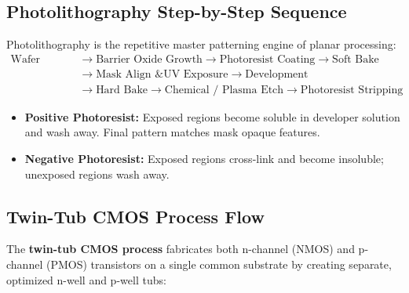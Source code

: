 \documentclass[12pt,a4paper]{article}
\begin{document}
\subsection{Photolithography Step-by-Step Sequence}
Photolithography is the repetitive master patterning engine of planar processing:
\begin{align*}
  \text{Wafer Clean} &\to \text{Barrier Oxide Growth} \to \text{Photoresist Coating} \to \text{Soft Bake} \\
  &\to \text{Mask Align \& UV Exposure} \to \text{Development} \\
  &\to \text{Hard Bake} \to \text{Chemical / Plasma Etch} \to \text{Photoresist Stripping}
\end{align*}

\begin{itemize}[leftmargin=*, itemsep=3pt]
  \item \textbf{Positive Photoresist:} Exposed regions become soluble in developer solution and wash away. Final pattern matches mask opaque features.
  \item \textbf{Negative Photoresist:} Exposed regions cross-link and become insoluble; unexposed regions wash away.
\end{itemize}

\subsection{Twin-Tub CMOS Process Flow}
The \textbf{twin-tub CMOS process} fabricates both n-channel (NMOS) and p-channel (PMOS) transistors on a single common substrate by creating separate, optimized n-well and p-well tubs:
\end{document}
